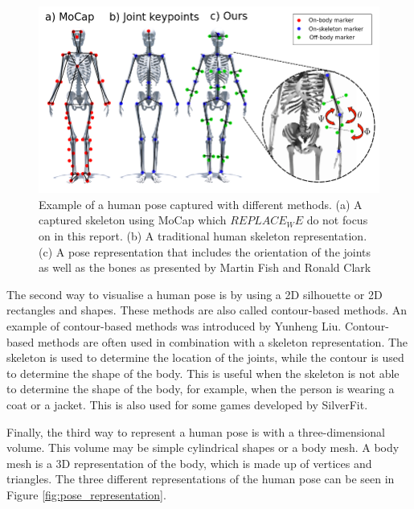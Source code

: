 \begin{figure}
    \centering
    \includegraphics[width=0.8\linewidth]{figures/HPE/PoseExample.png}
    \caption[Example for human Pose estimation]{Example of a human pose captured with different methods. (a) A captured skeleton using MoCap which $REPLACE_WE$ do not focus on in this report. (b) A traditional human skeleton representation. (c) A pose representation that includes the orientation of the joints as well as the bones as presented by Martin Fish and Ronald Clark\cite{KeypointOrientation}}
    \label{fig:pose_example}
\end{figure}

The second way to visualise a human pose is by using a 2D silhouette or 2D rectangles and shapes. These methods are also called contour-based methods. An example of contour-based methods was introduced by Yunheng Liu\cite{contourHPE}. Contour-based methods are often used in combination with a skeleton representation. The skeleton is used to determine the location of the joints, while the contour is used to determine the shape of the body. This is useful when the skeleton is not able to determine the shape of the body, for example, when the person is wearing a coat or a jacket. This is also used for some games developed by SilverFit.

Finally, the third way to represent a human pose is with a three-dimensional volume. This volume may be simple cylindrical shapes or a body mesh. A body mesh is a 3D representation of the body, which is made up of vertices and triangles. The three different representations of the human pose can be seen in Figure \ref{fig:pose_representation}.

